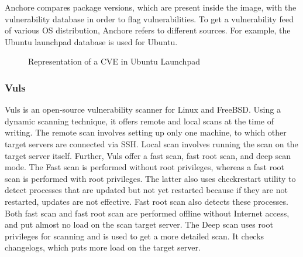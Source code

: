 \documentclass[a4paper,num-refs]{oup-contemporary}
\begin{document}
Anchore compares package versions, which are present inside the
image, with the vulnerability database in order to flag vulnerabilities.
To get a vulnerability feed of various OS distribution, Anchore refers to
different sources. For example, the Ubuntu launchpad database is used for Ubuntu.

\begin{figure}
        \caption{\label{example} Representation of a CVE in Ubuntu Launchpad}
\end{figure}

\subsubsection{Vuls}

Vuls is an open-source vulnerability scanner for Linux and FreeBSD.
Using a dynamic scanning technique, it offers
remote and local scans at the time of writing. The remote scan involves setting up only one machine, to
which other target servers are connected via SSH. Local scan involves running
the scan on the target server itself. Further, Vuls offer a fast scan, fast root scan,
and deep scan mode.
The Fast scan is performed without root privileges, whereas a fast root scan is
performed with root privileges. The latter also uses checkrestart utility to 
detect processes that are updated but not yet restarted because if they are not
restarted, updates are not effective. Fast root scan also detects these
processes. Both fast scan and fast root scan are performed offline without Internet
access, and put almost no load on the scan target server. The Deep scan uses
root privileges for scanning and is used to get a more detailed scan. It checks
changelogs, which puts more load on the target server.
\end{document}

